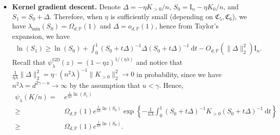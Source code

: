 \documentclass{article}
\theoremstyle{plain}
\theoremstyle{definition}
\theoremstyle{remark}
\newcommand{\rem}{\psi_\lambda}
\newcommand{\mr}{\mathrm}
\begin{document}
\begin{appendix}
\begin{itemize}
\item {\bf Kernel gradient descent.} Denote $\Delta = -\eta K_{> 0}/n$, $S_0=\mathrm{I}_n-\eta K_{0}/n$, and $S_1=S_0+\Delta$. Therefore, when $\eta$ is sufficiently small (depending on $\mathfrak{C}_5, \mathfrak{C}_6$), we have $\lambda_{\min}(S_0)=\Omega_{d, \mathbb{P}}(1)$ and $\Delta=o_{d, \mathbb{P}}(1)$, hence from Taylor's expansion, we have
\begin{equation*}
    \begin{aligned}
        \ln(S_1) \geq \ln(S_0) + \int_{0}^{1} (S_0 + t\Delta)^{-1} \Delta (S_0 + t\Delta)^{-1} ~\mathrm{d}t - O_{d, \mathbb{P}}(\|\Delta\|_{2}^{2})\mathrm{I}_n.
    \end{aligned}
\end{equation*}
Recall that $\rem^{\mr{GD}}(z) = (1-\eta z)^{1/(\eta \lambda)}$ 
and notice that $\frac{1}{\eta \lambda}\|\Delta\|_2^2 =  \eta \cdot (n^2\lambda)^{-1} \|K_{>0}\|_2^2 \to 0$ in probability, since we have $n^2\lambda = d^{2\gamma-u} \to \infty$ by the assumption that $u<\gamma$. 
Hence,
\begin{equation*}
    \begin{aligned}
        \rem(K/n) = &~ e^{\frac{1}{\eta \lambda}\ln(S_1)}\\
        \geq &~ 
        \Omega_{d, \mathbb{P}}(1) 
        e^{\frac{1}{\eta \lambda}\ln(S_0)}
        \exp\left\{-\frac{1}{n\lambda}
        \int_{0}^{1} (S_0 + t\Delta)^{-1} K_{>0} (S_0 + t\Delta)^{-1} ~\mathrm{d}t
        \right\}\\
        \geq &~
        \Omega_{d, \mathbb{P}}(1) 
        e^{\frac{1}{\eta \lambda}\ln(S_0)}.
    \end{aligned}
\end{equation*}

\end{itemize}



\iffalse


\end{appendix}
\end{document}

